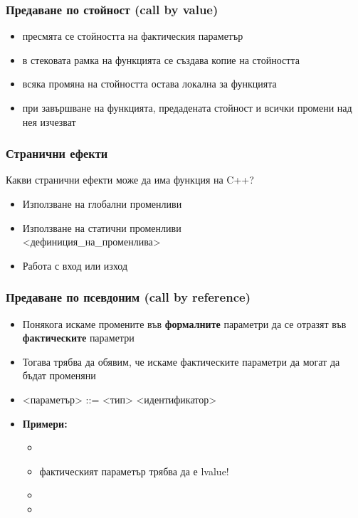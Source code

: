 \documentclass{beamer}
\begin{document}
\begin{frame}
  \frametitle{Предаване по стойност (call by value)}

  \begin{itemize}[<+->]
  \item пресмята се стойността на фактическия параметър
  \item в стековата рамка на функцията се създава \alert{копие} на стойността
  \item всяка промяна на стойността остава локална за функцията
  \item при завършване на функцията, предадената стойност и всички промени над нея \alert{изчезват}
  \end{itemize}
\end{frame}

\begin{frame}
  \frametitle{Странични ефекти}

  Какви странични ефекти може да има функция на C++?\\[1em]
  \pause
  \begin{itemize}[<+->]
  \item Използване на глобални променливи
  \item Използване на статични променливи\\
     <дефиниция\_на\_променлива>
  \item Работа с вход или изход
  \end{itemize}
\end{frame}

\begin{frame}
  \frametitle{Предаване по псевдоним (call by reference)}

  \begin{itemize}[<+->]
  \item Понякога искаме промените във \textbf{формалните} параметри
    да се отразят във \textbf{фактическите} параметри
  \item Тогава трябва да обявим, че искаме фактическите параметри да могат да бъдат променяни
  \item{} <параметър> ::= <тип>\tta{\&} <идентификатор>
  \item \textbf{Примери:}
    \begin{itemize}
    \item {}
    \item \alert{фактическият параметър трябва да е lvalue!}
    \item {}
    \item {}
    \end{itemize}
  \end{itemize}
\end{frame}
\end{document}
